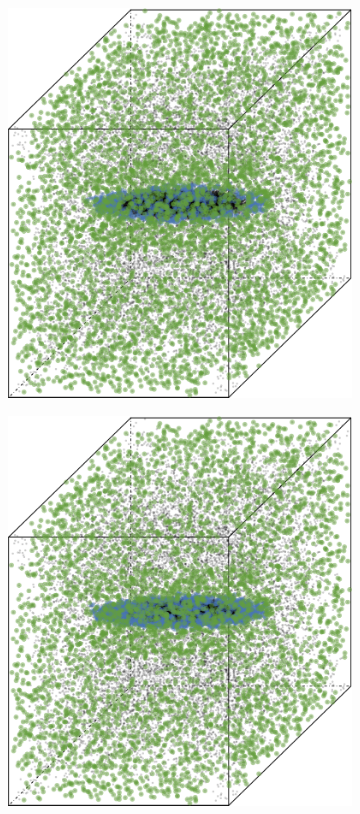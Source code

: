 \begin{figure}
\begin{subfigure}{0.23\textwidth}
					\includegraphics[keepaspectratio=true, width=\textwidth, height=0.23\textheight]{discussion/img/baakman_1_60000_anisotropy.png}
					\caption{}
					\label{fig:discussion:anisotropy:baakman1}
				\end{subfigure}
				\subfigvspace
				\begin{subfigure}{0.23\textwidth}
					\centering
					\includegraphics[keepaspectratio=true, width=\textwidth, height=0.23\textheight]{discussion/img/baakman_4_60000_anisotropy.png}

\end{subfigure}
\end{figure}

